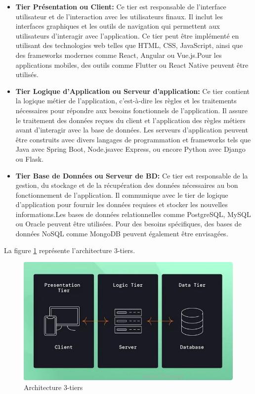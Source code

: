 \documentclass[12pt]{report}
\begin{document}
			\begin{itemize}
				\item \textbf{Tier Présentation ou Client:} Ce tier est responsable de l'interface utilisateur et de l'interaction avec les utilisateurs finaux. Il inclut les interfaces graphiques et les outils de navigation qui permettent aux utilisateurs d'interagir avec l'application. Ce tier peut être implémenté en utilisant des technologies web telles que HTML, CSS, JavaScript, ainsi que des frameworks modernes comme React, Angular ou Vue.js.Pour les applications mobiles, des outils comme Flutter ou React Native peuvent être utilisés.
				\item \textbf{Tier Logique d'Application ou Serveur d'application:} Ce tier contient la logique métier de l'application, c'est-à-dire les règles et les traitements nécessaires pour répondre aux besoins fonctionnels de l'application. Il assure le traitement des données reçues du client et l'application des règles métiers avant d'interagir avec la base de données. Les serveurs d'application peuvent être construits avec divers langages de programmation et frameworks tels que Java avec Spring Boot, Node.jsavec Express, ou encore Python avec Django ou Flask.	
				\item \textbf{Tier Base de Données ou Serveur de BD:} Ce tier est responsable de la gestion, du stockage et de la récupération des données nécessaires au bon fonctionnement de l'application. Il communique avec le tier de logique d'application pour fournir les données requises et stocker les nouvelles informations.Les bases de données relationnelles comme PostgreSQL, MySQL ou Oracle peuvent être utilisées. Pour des besoins spécifiques, des bases de données NoSQL comme MongoDB peuvent également être envisagées.
			\end{itemize}

			La figure \ref{fig:archi3T} représente l’architecture 3-tiers.
			
			\begin{figure}[h]
				\centering
				\includegraphics[width=\textwidth]{archi3T.jpg}
				\caption{Architecture 3-tiers \cite{3Tier}}
				\label{fig:archi3T}
			\end{figure}
			\FloatBarrier
\end{document}
